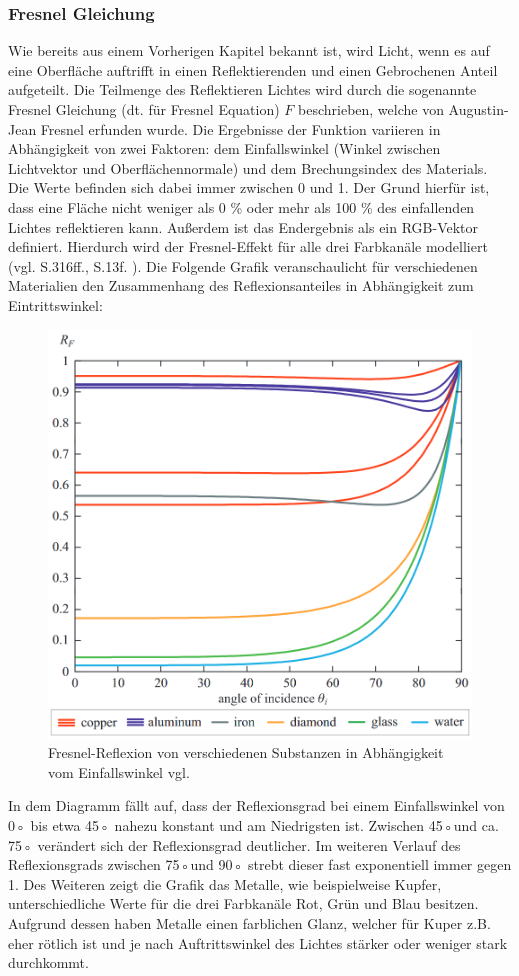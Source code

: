 \documentclass[
  11pt,
  a4paper,
  oneside
  ]{article}
\begin{document}
\subsubsection{Fresnel Gleichung}\label{sec:fresnel}
Wie bereits aus einem Vorherigen Kapitel bekannt ist, wird Licht, wenn es auf eine Oberfläche auftrifft in einen Reflektierenden und einen Gebrochenen Anteil aufgeteilt. Die Teilmenge des Reflektieren Lichtes wird durch die sogenannte Fresnel Gleichung (dt. für Fresnel Equation) $F$ beschrieben, welche von Augustin-Jean Fresnel erfunden wurde. Die Ergebnisse der Funktion variieren in Abhängigkeit von zwei Faktoren: dem Einfallswinkel (Winkel zwischen Lichtvektor und Oberflächennormale) und dem Brechungsindex des Materials. Die Werte befinden sich dabei immer zwischen 0 und 1. Der Grund hierfür ist, dass eine Fläche nicht weniger als 0 \% oder mehr als 100 \% des einfallenden Lichtes reflektieren kann. Außerdem ist das Endergebnis als ein RGB-Vektor definiert. Hierdurch wird der Fresnel-Effekt für alle drei Farbkanäle modelliert 
(vgl. S.316ff.\cite{realTimeRendering4th}, S.13f. \cite{rtrPaper}). Die Folgende Grafik veranschaulicht für verschiedenen Materialien den Zusammenhang des Reflexionsanteiles in Abhängigkeit zum Eintrittswinkel:
\begin{figure}[H]
  \centering
  \includegraphics*[width=0.70 \textwidth]{images/fresnelDiagram.png}
  \caption{Fresnel-Reflexion von verschiedenen Substanzen in Abhängigkeit vom Einfallswinkel vgl. \cite{learnOpenGL}}
  \label{fig:img5}
\end{figure}

In dem Diagramm fällt auf, dass der Reflexionsgrad bei einem Einfallswinkel von 0◦ bis etwa 45◦ nahezu konstant und am Niedrigsten ist.  Zwischen 45◦und ca. 75◦ verändert sich der Reflexionsgrad deutlicher. Im weiteren Verlauf des Reflexionsgrads zwischen 75◦und 90◦ strebt dieser fast exponentiell immer gegen 1. Des Weiteren zeigt die Grafik das Metalle, wie beispielweise Kupfer, unterschiedliche Werte für die drei Farbkanäle Rot, Grün und Blau besitzen. Aufgrund dessen haben Metalle einen farblichen Glanz, welcher für Kuper z.B. eher rötlich ist und je nach Auftrittswinkel des Lichtes stärker oder weniger stark durchkommt. 
\end{document}
